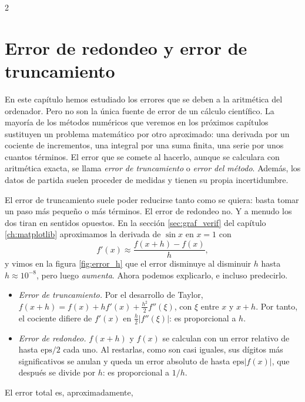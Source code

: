 \begin{paracol}{2}
\section[Error de redondeo y error de truncamiento]{Error de redondeo y error de truncamiento}\label{sec:red_trunc}
En este capítulo hemos estudiado los errores que se deben a la aritmética del ordenador. Pero no son la única fuente de error de un cálculo científico. La mayoría de los métodos numéricos que veremos en los próximos capítulos sustituyen un problema matemático por otro aproximado: una derivada por un cociente de incrementos, una integral por una suma finita, una serie por unos cuantos términos. El error que se comete al hacerlo, aunque se calculara con aritmética exacta, se llama \emph{error de truncamiento} o \emph{error del método}. Además, los datos de partida suelen proceder de medidas y tienen su propia incertidumbre.

El error de truncamiento suele poder reducirse tanto como se quiera: basta tomar un paso más pequeño o más términos. El error de redondeo no. Y a menudo los dos tiran en sentidos opuestos. En la sección \ref{sec:graf_verif} del capítulo \ref{ch:matplotlib} aproximamos la derivada de $\sin x$ en $x=1$ con
$$f'(x)\approx\frac{f(x+h)-f(x)}{h},$$
y vimos en la figura \ref{fig:error_h} que el error disminuye al disminuir $h$ hasta $h\approx10^{-8}$, pero luego \emph{aumenta}. Ahora podemos explicarlo, e incluso predecirlo.

\begin{itemize}
\item \emph{Error de truncamiento.} Por el desarrollo de Taylor, $f(x+h)=f(x)+hf'(x)+\frac{h^2}{2}f''(\xi)$, con $\xi$ entre $x$ y $x+h$. Por tanto, el cociente difiere de $f'(x)$ en $\frac{h}{2}\vert f''(\xi)\vert$: es proporcional a $h$.
\item \emph{Error de redondeo.} $f(x+h)$ y $f(x)$ se calculan con un error relativo de hasta $\text{eps}/2$ cada uno. Al restarlas, como son casi iguales, sus dígitos más significativos se anulan y queda un error absoluto de hasta $\text{eps}\vert f(x)\vert$, que después se divide por $h$: es proporcional a $1/h$.
\end{itemize}
El error total es, aproximadamente,
\switchcolumn

\end{paracol}
